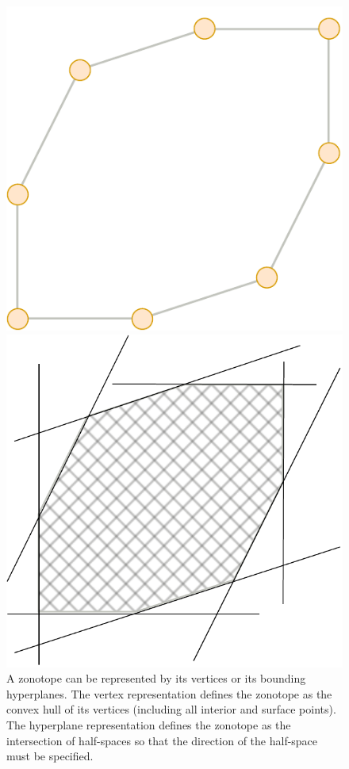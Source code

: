 \begin{figure}[!htb]
  \captionsetup{justification=centering}
  \begin{minipage}{0.49\linewidth}
    \centering
    \includegraphics[trim={0 0 0 0},clip, width=0.6\linewidth]{img/chapter_2/zonotope_vertices.pdf}
  \end{minipage}
  \hfill
  \begin{minipage}{0.49\linewidth}
    \centering
    \includegraphics[trim={0 0 0 0},clip,width=0.75\linewidth]{img/chapter_2/zonotope_hyperplanes.pdf}
  \end{minipage}
  \caption{A zonotope can be represented by its vertices or its bounding hyperplanes. The vertex representation defines the zonotope as the convex hull of its vertices (including all interior and surface points). The hyperplane representation defines the zonotope as the intersection of half-spaces so that the direction of the half-space must be specified.}
  \label{fig:zonotope_vertices_hyperplanes}
\end{figure}

